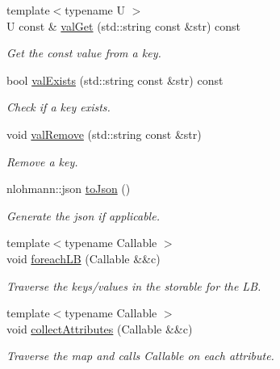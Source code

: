 \begin{DoxyCompactItemize}
{\footnotesize template$<$typename U $>$ }\\U const  \& \hyperlink{structvt_1_1vrt_1_1collection_1_1storage_1_1_storable_a5014622ff587047270462efeca4ca2dd}{val\+Get} (std\+::string const \&str) const
\begin{DoxyCompactList}\small\item\em Get the const value from a key. \end{DoxyCompactList}\item 
bool \hyperlink{structvt_1_1vrt_1_1collection_1_1storage_1_1_storable_a46884264a54e5be7fc231208dc468b8e}{val\+Exists} (std\+::string const \&str) const
\begin{DoxyCompactList}\small\item\em Check if a key exists. \end{DoxyCompactList}\item 
void \hyperlink{structvt_1_1vrt_1_1collection_1_1storage_1_1_storable_a760fb8a543d0684b259fdbf078bcafb8}{val\+Remove} (std\+::string const \&str)
\begin{DoxyCompactList}\small\item\em Remove a key. \end{DoxyCompactList}\item 
nlohmann\+::json \hyperlink{structvt_1_1vrt_1_1collection_1_1storage_1_1_storable_afc24cbef1191dfd0457575ddd28b12d9}{to\+Json} ()
\begin{DoxyCompactList}\small\item\em Generate the json if applicable. \end{DoxyCompactList}\item 
{\footnotesize template$<$typename Callable $>$ }\\void \hyperlink{structvt_1_1vrt_1_1collection_1_1storage_1_1_storable_a8788e4d3df88f0c82c74a05cc4e328f3}{foreach\+LB} (Callable \&\&c)
\begin{DoxyCompactList}\small\item\em Traverse the keys/values in the storable for the LB. \end{DoxyCompactList}\item 
{\footnotesize template$<$typename Callable $>$ }\\void \hyperlink{structvt_1_1vrt_1_1collection_1_1storage_1_1_storable_a42399903490624cc86cc9af57839806f}{collect\+Attributes} (Callable \&\&c)
\begin{DoxyCompactList}\small\item\em Traverse the map and calls Callable on each attribute. \end{DoxyCompactList}\end{DoxyCompactItemize}

